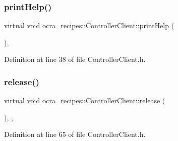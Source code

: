 \hypertarget{classocra__recipes_1_1ControllerClient_a6bb943c2525cdc0fe82c83380c4f8900}{}\label{classocra__recipes_1_1ControllerClient_a6bb943c2525cdc0fe82c83380c4f8900} 
\subsubsection{\texorpdfstring{print\+Help()}{printHelp()}}
{\footnotesize\ttfamily virtual void ocra\+\_\+recipes\+::\+Controller\+Client\+::print\+Help (\begin{DoxyParamCaption}{ }\end{DoxyParamCaption})\hspace{0.3cm}{\ttfamily [inline]}, {\ttfamily [virtual]}}



Definition at line 38 of file Controller\+Client.\+h.

\hypertarget{classocra__recipes_1_1ControllerClient_a181c868d0165b06b9b10a9e40127bc69}{}\label{classocra__recipes_1_1ControllerClient_a181c868d0165b06b9b10a9e40127bc69} 
\subsubsection{\texorpdfstring{release()}{release()}}
{\footnotesize\ttfamily virtual void ocra\+\_\+recipes\+::\+Controller\+Client\+::release (\begin{DoxyParamCaption}{ }\end{DoxyParamCaption})\hspace{0.3cm}{\ttfamily [inline]}, {\ttfamily [protected]}, {\ttfamily [virtual]}}



Definition at line 65 of file Controller\+Client.\+h.

\hypertarget{classocra__recipes_1_1ControllerClient_a6666247713cb0e1db55b51b9a5ae49a1}{}\label{classocra__recipes_1_1ControllerClient_a6666247713cb0e1db55b51b9a5ae49a1} 
